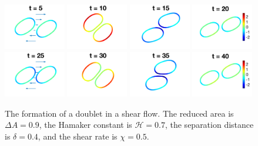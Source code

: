 \documentclass[prf,superscriptaddress,showkeys]{revtex4-1}
\begin{document}
\begin{figure}[htp]
  \includegraphics[width=0.24\textwidth]{figs/adR4em1adS7em1Chi5em1_ra090_image01.png}
  \includegraphics[width=0.24\textwidth]{figs/adR4em1adS7em1Chi5em1_ra090_image02.png}
  \includegraphics[width=0.24\textwidth]{figs/adR4em1adS7em1Chi5em1_ra090_image03.png}
  \includegraphics[width=0.24\textwidth]{figs/adR4em1adS7em1Chi5em1_ra090_image04.png}
  \includegraphics[width=0.24\textwidth]{figs/adR4em1adS7em1Chi5em1_ra090_image05.png}
  \includegraphics[width=0.24\textwidth]{figs/adR4em1adS7em1Chi5em1_ra090_image06.png}
  \includegraphics[width=0.24\textwidth]{figs/adR4em1adS7em1Chi5em1_ra090_image07.png}
  \includegraphics[width=0.24\textwidth]{figs/adR4em1adS7em1Chi5em1_ra090_image08.png}
  \caption{\label{fig:doublet090} The formation of a doublet in a shear
  flow.  The reduced area is $\Delta A = 0.9$, the Hamaker constant is
  $\mathcal{H}=0.7$, the separation distance is $\delta = 0.4$, and the
  shear rate is $\chi=0.5$.}
\end{figure}
\end{document}
